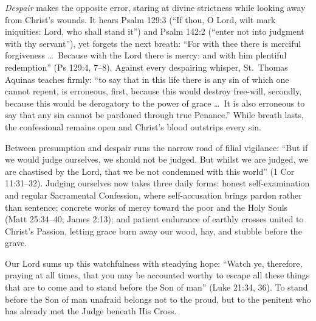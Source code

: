 \textit{Despair} makes the opposite error, staring at divine strictness while looking away from Christ's wounds. It hears Psalm 129:3 (``If thou, O Lord, wilt mark iniquities: Lord, who shall stand it'') and Psalm 142:2 (``enter not into judgment with thy servant''), yet forgets the next breath: ``For with thee there is merciful forgiveness \dots\ Because with the Lord there is mercy: and with him plentiful redemption'' (Ps 129:4, 7--8). Against every despairing whisper, St.\ Thomas Aquinas teaches firmly: ``to say that in this life there is any sin of which one cannot repent, is erroneous, first, because this would destroy free-will, secondly, because this would be derogatory to the power of grace \dots\ It is also erroneous to say that any sin cannot be pardoned through true Penance.'' While breath lasts, the confessional remains open and Christ's blood outstrips every sin.

Between presumption and despair runs the narrow road of filial vigilance: ``But if we would judge ourselves, we should not be judged. But whilst we are judged, we are chastised by the Lord, that we be not condemned with this world'' (1 Cor 11:31--32). Judging ourselves now takes three daily forms: honest self-examination and regular Sacramental Confession, where self-accusation brings pardon rather than sentence; concrete works of mercy toward the poor and the Holy Souls (Matt 25:34--40; James 2:13); and patient endurance of earthly crosses united to Christ's Passion, letting grace burn away our wood, hay, and stubble before the grave.

Our Lord sums up this watchfulness with steadying hope: ``Watch ye, therefore, praying at all times, that you may be accounted worthy to escape all these things that are to come and to stand before the Son of man'' (Luke 21:34, 36). To stand before the Son of man unafraid belongs not to the proud, but to the penitent who has already met the Judge beneath His Cross.
